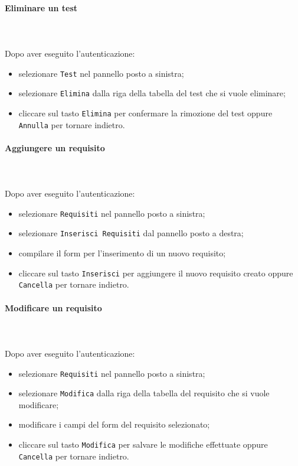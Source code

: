 \paragraph{Eliminare un test} \mbox{}\\ \mbox{}\\
Dopo aver eseguito l'autenticazione:
\begin{itemize}
	\item selezionare \texttt{Test} nel pannello posto a sinistra;
	\item selezionare \texttt{Elimina} dalla riga della tabella del test
		che si vuole eliminare;\
	\item cliccare sul tasto \texttt{Elimina} per confermare la rimozione del test
		oppure \texttt{Annulla} per tornare indietro.
\end{itemize}		

\paragraph{Aggiungere un requisito} \mbox{}\\ \mbox{}\\
Dopo aver eseguito l'autenticazione:
\begin{itemize}
	\item selezionare \texttt{Requisiti} nel pannello posto a sinistra;
	\item selezionare \texttt{Inserisci Requisiti} dal pannello posto a destra;
	\item compilare il form per l'inserimento di un nuovo requisito;
	\item cliccare sul tasto \texttt{Inserisci} per aggiungere il nuovo requisito
		creato oppure \texttt{Cancella} per tornare indietro.	
\end{itemize}

\paragraph{Modificare un requisito} \mbox{}\\ \mbox{}\\
Dopo aver eseguito l'autenticazione:
\begin{itemize}
	\item selezionare \texttt{Requisiti} nel pannello posto a sinistra;
	\item selezionare \texttt{Modifica} dalla riga della tabella del requisito
		che si vuole modificare;
	\item modificare i campi del form del requisito selezionato;
	\item cliccare sul tasto \texttt{Modifica} per salvare le modifiche effettuate
		oppure \texttt{Cancella} per tornare indietro.
\end{itemize}

